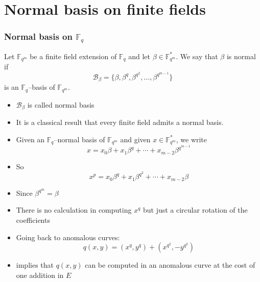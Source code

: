 \documentclass[10pt,handout]{beamer} %
\newcommand{\F}{\mathbb F}
\theoremstyle{definition}
\begin{document}
 \section{Normal basis on finite fields}
 \begin{frame}
  \frametitle{Normal basis on $\F_q$}
  
  \begin{Definition}
   Let $\F_{q^m}$ be a finite field extension of $\F_q$ and let $\beta\in\F_{q^m}^*$. We say that $\beta$ is \alert{normal} if
   $$ \mathcal B_\beta=\{ \beta, \beta^q, \beta^{q^2}, \ldots, \beta^{q^{m-1}} \} $$
   is an $\F_q$--basis of $\F_{q^m}$.
  \end{Definition}

 \begin{itemize}[<+-|alert@+>] 
\item $\mathcal B_\beta$ is called \alert{normal basis}
 \item  It is a classical result that every finite field admits a normal basis.
\item Given an  $\F_q$--normal basis of $\F_{q^m}$ and given $x\in\F_{q^m}^*$, we write
$$x=x_0\beta+x_1\beta^q+\cdots+x_{m-2}\beta^{q^{m-1}}$$
\item So 
$$x^p=x_0\beta^q+x_1\beta^{q^2}+\cdots+x_{m-2}\beta$$
\item Since $\beta^{q^m}=\beta$
\item There is no calculation in computing $x^q$ but just a circular rotation of the coefficients
\item Going back to anomalous curves:
 $$q(x,y)=(x^q,y^q)+(x^{q^2},-y^{q^2})$$
 \item implies that $q(x,y)$ can be computed in an anomalous curve at the cost of one addition in $E$
\end{itemize}
 \end{frame}

 
 
\end{document}
